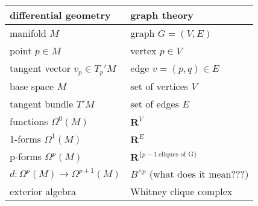\documentclass{article}
\def\R{\mathbf{R}}
\begin{document}
\bigskip

\begin{tabular}{l|l}
\bf differential geometry & \bf graph theory \\
\hline
manifold $M$ & graph $G=(V,E)$
\\
point $p\in M$ &
vertex $p\in V$
\\
tangent vector $v_p\in T_p'M$ &
edge $v=(p,q)\in E$
\\
	base space $M$ & set of vertices $V$ \\
	tangent bundle $T'M$ & set of edges $E$ \\
	functions $\Omega^0(M)$ & $\R^V$ \\
	1-forms $\Omega^1(M)$ & $\R^E$ \\
	p-forms $\Omega^p(M)$ & $\R^{\{p-1\ \textrm{cliques of G}\}}$ \\
	$d:\Omega^p(M)\to\Omega^{p+1}(M)$ & $B^{\wedge p}$ {\color{gray}(what does it mean???}) \\
	exterior algebra & Whitney clique complex \\
\end{tabular}
\end{document}
